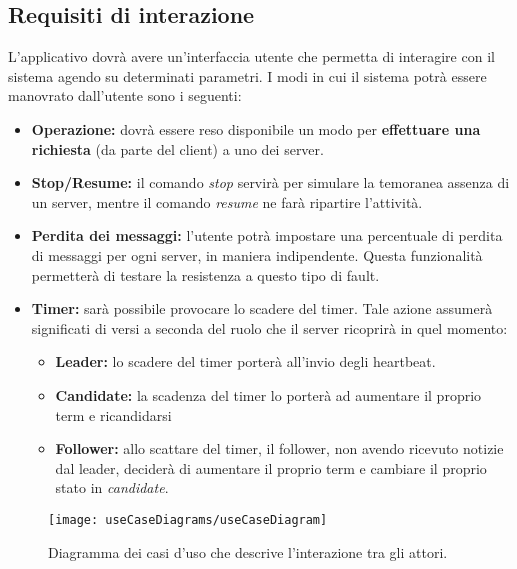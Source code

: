 	\subsection{Requisiti di interazione}
	L'applicativo dovrà avere un'interfaccia utente che permetta di interagire con il sistema agendo su determinati parametri. I modi in cui il sistema potrà essere manovrato dall'utente sono i seguenti:
		\begin{itemize}
			\item \textbf{Operazione:} dovrà essere reso disponibile un modo per \textbf{effettuare una richiesta} (da parte del client) a uno dei server.
			\item \textbf{Stop/Resume:} il comando \textit{stop} servirà per simulare la temoranea assenza di un server, mentre il comando \textit{resume} ne farà ripartire l'attività. 
			\item \textbf{Perdita dei messaggi:} l'utente potrà impostare una percentuale di perdita di messaggi per ogni server, in maniera indipendente. Questa funzionalità permetterà di testare la resistenza a questo tipo di fault.
			\item \textbf{Timer:} sarà possibile provocare lo scadere del timer. Tale azione assumerà significati di versi a seconda del ruolo che il server ricoprirà in quel momento:
				\begin{itemize}
					\item \textbf{Leader:} lo scadere del timer porterà all'invio degli heartbeat.
					\item \textbf{Candidate:} la scadenza del timer lo porterà ad aumentare il proprio term e ricandidarsi
					\item \textbf{Follower:} allo scattare del timer, il follower, non avendo ricevuto notizie dal leader, deciderà di aumentare il proprio term e cambiare il proprio stato in \textit{candidate}.
				\end{itemize}

		\end{itemize}


\begin{figure}[H]
  \centering
  \texttt{[image: useCaseDiagrams/useCaseDiagram]}
  \caption[useCaseDiagramCaption]{Diagramma dei casi d'uso che descrive l'interazione tra gli attori.}
  
  \label{fig:figure28}
\end{figure}